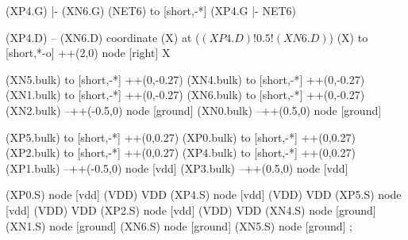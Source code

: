 \begin{circuitikz}[american]
	(XP4.G) |- (XN6.G)
	(NET6) to [short,-*] (XP4.G |- NET6)
	
	(XP4.D) -- (XN6.D)
	coordinate (X) at ($(XP4.D)!0.5!(XN6.D)$)
	(X) to [short,*-o] ++(2,0) node [right] {X}
	
	(XN5.bulk) to [short,-*] ++(0,-0.27)
	(XN4.bulk) to [short,-*] ++(0,-0.27)
	(XN1.bulk) to [short,-*] ++(0,-0.27)
	(XN6.bulk) to [short,-*] ++(0,-0.27)
	(XN2.bulk) --++(-0.5,0) node [ground]{}
	(XN0.bulk) --++(0.5,0) node [ground]{}
	
	(XP5.bulk) to [short,-*] ++(0,0.27)
	(XP0.bulk) to [short,-*] ++(0,0.27)
	(XP2.bulk) to [short,-*] ++(0,0.27)
	(XP4.bulk) to [short,-*] ++(0,0.27)
	(XP1.bulk) --++(-0.5,0) node [vdd]{}
	(XP3.bulk) --++(0.5,0) node [vdd]{}
	

	(XP0.S) node [vdd] (VDD) {VDD}
	(XP4.S) node [vdd] (VDD) {VDD}
	(XP5.S) node [vdd] (VDD) {VDD}
	(XP2.S) node [vdd] (VDD) {VDD}
	(XN4.S) node [ground] {}
	(XN1.S) node [ground] {}
	(XN6.S) node [ground] {}
	(XN5.S) node [ground] {}
;

\end{circuitikz}
